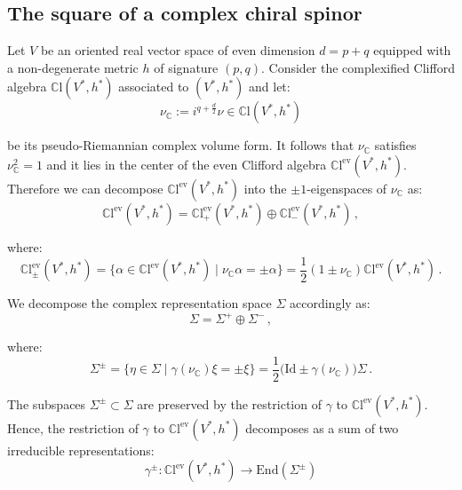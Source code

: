 \documentclass[10pt,a4paper,twoside,reqno]{amsart}
\theoremstyle{plain}
\theoremstyle{definition}
\theoremstyle{remark}
\newcommand{\End}{\mathrm{End}}
\def\C{\mathbb{C}}
\def\Id{\mathrm{Id}}
\begin{document}

\subsection{The square of a complex chiral spinor}


Let $V$ be an oriented real vector space of even dimension $d=p+q$ equipped with a non-degenerate metric $h$ of signature $(p,q)$. Consider the complexified Clifford algebra $\C\mathrm{l}(V^*,h^*)$ associated to $(V^*,h^*)$ and let:
\begin{equation*}
\nu_\C:=i^{q+\frac{d}{2}}\nu\in\C\mathrm{l}(V^*,h^*)    
\end{equation*}

\noindent
be its pseudo-Riemannian complex volume form. It follows that $\nu_\C$ satisfies $\nu_\C^2=1$ and it lies in the center of the even Clifford algebra $\C\mathrm{l}^{\mathrm{ev}}(V^*,h^*)$. Therefore we can decompose $\C\mathrm{l}^{\mathrm{ev}}(V^*,h^*)$ into the $\pm1$-eigenspaces of $\nu_\C$ as:
\begin{equation*}
\C\mathrm{l}^{\mathrm{ev}}(V^*,h^*)=\C\mathrm{l}^{\mathrm{ev}}_+(V^*,h^*)\oplus\C\mathrm{l}^{\mathrm{ev}}_-(V^*,h^*)\, ,    
\end{equation*}

\noindent
where:
\begin{equation*}
\C\mathrm{l}^{\mathrm{ev}}_{\pm}(V^*,h^*)=\{\alpha\in\C\mathrm{l}^{\mathrm{ev}}(V^*,h^*)\mid\nu_\C\alpha=\pm\alpha\}=\frac{1}{2}(1\pm\nu_\C)\C\mathrm{l}^{\mathrm{ev}}(V^*,h^*)\, .
\end{equation*}

\noindent
We decompose the complex representation space $\Sigma$ accordingly as:
\begin{equation*}
\Sigma=\Sigma^+ \oplus \Sigma^-\, ,
\end{equation*}

\noindent
where:
\begin{equation*}
 \Sigma^\pm=\{\eta \in \Sigma\mid\gamma(\nu_\C)\xi=\pm\xi\}=\frac{1}{2}\big(\Id\pm\gamma(\nu_\C)\big)\Sigma\, .   
\end{equation*}

\noindent
The subspaces $\Sigma^\pm\subset\Sigma$ are preserved by the restriction of $\gamma$ to $\C\mathrm{l}^{\mathrm{ev}}(V^*,h^*)$. Hence, the restriction of $\gamma$ to $\C\mathrm{l}^{\mathrm{ev}}(V^*,h^*)$ decomposes as a sum of two irreducible representations:
\begin{equation*}
\gamma^\pm\colon\C\mathrm{l}^{\mathrm{ev}}(V^*,h^*)\to\End(\Sigma^\pm)    
\end{equation*}
\end{document}
